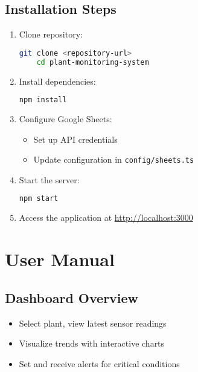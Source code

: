 \documentclass[12pt,a4paper]{article}
\begin{document}
\subsection{Installation Steps}
\begin{enumerate}[leftmargin=*]
    \item Clone repository:
    \begin{lstlisting}[language=bash]
    git clone <repository-url>
    cd plant-monitoring-system
    \end{lstlisting}
    
    \item Install dependencies:
    \begin{lstlisting}[language=bash]
    npm install
    \end{lstlisting}
    
    \item Configure Google Sheets:
    \begin{itemize}
        \item Set up API credentials
        \item Update configuration in \texttt{config/sheets.ts}
    \end{itemize}
    
    \item Start the server:
    \begin{lstlisting}[language=bash]
    npm start
    \end{lstlisting}
    
    \item Access the application at \url{http://localhost:3000}
\end{enumerate}





\section{User Manual}

\subsection{Dashboard Overview}
\begin{itemize}[leftmargin=*]
    \item Select plant, view latest sensor readings
    \item Visualize trends with interactive charts
    \item Set and receive alerts for critical conditions
\end{itemize}
\end{document}
